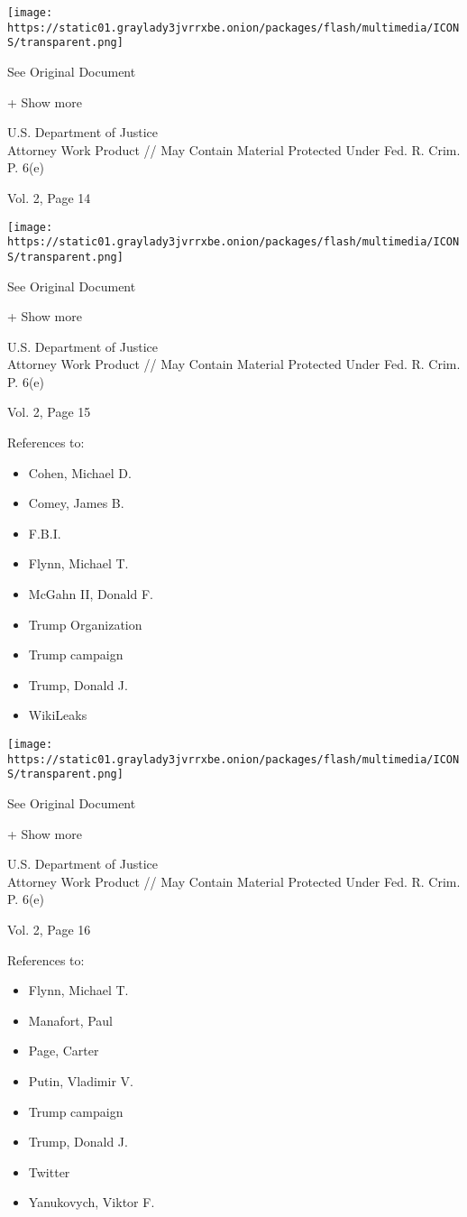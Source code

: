 \protect\hyperlink{}{}

\texttt{[image: https://static01.graylady3jvrrxbe.onion/packages/flash/multimedia/ICONS/transparent.png]}

See Original Document

+ Show more

U.S. Department of Justice\\
Attorney Work Product // May Contain Material Protected Under Fed. R.
Crim. P. 6(e)

Vol. 2, Page 14

\protect\hyperlink{}{}

\texttt{[image: https://static01.graylady3jvrrxbe.onion/packages/flash/multimedia/ICONS/transparent.png]}

See Original Document

+ Show more

U.S. Department of Justice\\
Attorney Work Product // May Contain Material Protected Under Fed. R.
Crim. P. 6(e)

Vol. 2, Page 15

References to:

\begin{itemize}
\tightlist
\item
  Cohen, Michael D.
\item
  Comey, James B.
\item
  F.B.I.
\item
  Flynn, Michael T.
\item
  McGahn II, Donald F.
\item
  Trump Organization
\item
  Trump campaign
\item
  Trump, Donald J.
\item
  WikiLeaks
\end{itemize}

\protect\hyperlink{}{}

\texttt{[image: https://static01.graylady3jvrrxbe.onion/packages/flash/multimedia/ICONS/transparent.png]}

See Original Document

+ Show more

U.S. Department of Justice\\
Attorney Work Product // May Contain Material Protected Under Fed. R.
Crim. P. 6(e)

Vol. 2, Page 16

References to:

\begin{itemize}
\tightlist
\item
  Flynn, Michael T.
\item
  Manafort, Paul 
\item
  Page, Carter
\item
  Putin, Vladimir V.
\item
  Trump campaign
\item
  Trump, Donald J.
\item
  Twitter
\item
  Yanukovych, Viktor F.
\end{itemize}

